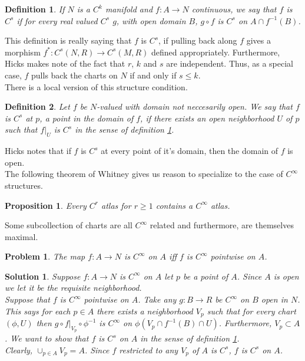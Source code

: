 \documentclass{article}
\theoremstyle{problemstyle}
\newtheorem{problem}{Problem}
\theoremstyle{problemstyle}
\newtheorem{solution}{Solution}
\theoremstyle{problemstyle}
\newtheorem{definition}{Definition}
\theoremstyle{problemstyle}
\newtheorem{proposition}{Proposition}
\theoremstyle{problemstyle}
\begin{document}
\begin{definition}\label{C^s map of manifolds}
If $N$ is a $C^k$ manifold and $f:A \rightarrow N$ continuous, we say that $f$ is $C^s$ if for every real valued $C^s$ $g$, with open domain $B$, $g \circ f$ is $C^s$ on $A \cap f^{-1}(B)$. 
\end{definition}

This definition is really saying that $f$ is $C^s$, if pulling back along $f$ gives a morphism $f^*: C^s(N,R) \rightarrow C^s(M,R)$ defined appropriately. Furthermore, Hicks makes note of the fact that $r$, $k$ and $s$ are independent. Thus, as a special case, $f$ pulls back the charts on $N$ if and only if $s \leq k$.\\

There is a local version of this structure condition. 

\begin{definition}\label{restriction C^s}
Let $f$ be $N$-valued with domain not neccesarily open. We say that $f$ is $C^s$ at $p$, a point in the domain of $f$, if there exists an open neighborhood $U$ of $p$ such that $f|_{U}$ is $C^s$ in the sense of definition \ref{C^s map of manifolds}. 
\end{definition}

Hicks notes that if $f$ is $C^s$ at every point of it's domain, then the domain of $f$ is open.\\ 

The following theorem of Whitney gives us reason to specialize to the case of $C^\infty$ structures. 

\begin{proposition}
Every $C^r$ atlas for $r \geq 1$ contains a $C^\infty$ atlas.
\end{proposition}

Some subcollection of charts are all $C^\infty$ related and furthermore, are themselves maximal. 

\begin{problem}\label{pointwise C infinity}
The map $f:A \rightarrow N$ is $C^\infty$ on $A$ iff $f$ is $C^\infty$ pointwise on $A$.  
\end{problem}

\begin{solution}
Suppose $f:A \rightarrow N$ is $C^\infty$ on $A$ let $p$ be a point of $A$. Since $A$ is open we let it be the requisite neighborhood.\\

Suppose that $f$ is $C^\infty$ pointwise on $A$. Take any $g:B \rightarrow R$ be $C^\infty$ on $B$ open in $N$. This says for each $p \in A$ there exists a neighborhood $V_p$ such that for every chart $(\phi, U)$ then $g \circ f|_{V_p} \circ \phi^{-1}$ is $C^\infty$ on $\phi(V_p \cap f^{-1}(B) \cap U)$. Furthermore, $V_p \subset A$. We want to show that $f$ is $C^s$ on $A$ in the sense of definition \ref{C^s map of manifolds}.\\ 

Clearly, $\cup_{p \in A}V_p = A$. Since $f$ restricted to any $V_p$ of $A$ is $C^s$, $f$ is $C^s$ on $A$. \end{solution}
\end{document}
